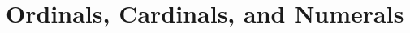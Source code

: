 \documentclass[../main.tex]{subfiles}
\begin{document}
\setcounter{chapter}{2}
\chapter{Ordinals, Cardinals, and Numerals}\label{cha:ordinals-cardinals-and-numerals}

\biblio
\end{document}
